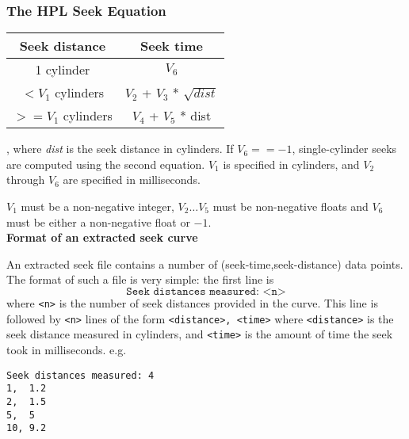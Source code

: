 \subsubsection{The HPL Seek Equation}
\label{seek.hpl}

\begin{tabular}{cc}
Seek distance     & Seek time \\ \hline
1 cylinder        & $V_6$ \\
$<$$V_1$ cylinders  & $V_2$ + $V_3$ * $\sqrt{dist}$ \\
$>=$$V_1$ cylinders & $V_4$ + $V_5$ * dist \\
\end{tabular}
, where {\it dist} is the seek distance in cylinders.
\newline
If $V_6 == -1$, single-cylinder seeks are computed using the second equation.
$V_1$ is specified in cylinders, and $V_2$ through $V_6$ are specified in 
milliseconds.

$V_1$ must be a non-negative integer, $V_2 \ldots V_5$ must be
non-negative floats and $V_6$ must be either a non-negative float or
$-1$.\\


\noindent\textbf{Format of an extracted seek curve}
\label{seek.extract}

An extracted seek file contains a number of (seek-time,seek-distance)
data points.
The format of such a file is very simple: the first line is
\[\texttt{Seek distances measured: <n>}\]
where \texttt{<n>} is the number of seek distances provided in the
curve.  This line is followed by \texttt{<n>} lines of the form
\texttt{<distance>, <time>} where \texttt{<distance>} is the seek
distance measured in cylinders, and \texttt{<time>} is the amount of
time the seek took in milliseconds. e.g.

\begin{verbatim}
Seek distances measured: 4
1,  1.2
2,  1.5
5,  5
10, 9.2
\end{verbatim}




